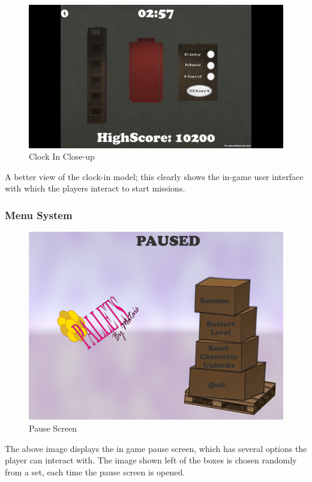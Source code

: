 \documentclass[12pt]{article}
\begin{document}
\begin{figure}[H]
	\caption{Clock In Close-up}
		\includegraphics[width=\textwidth]{images/clockInClose}
\end{figure}
A better view of the clock-in model; this clearly shows the in-game user interface with which the players interact to start missions.

\subsubsection{Menu System}
\begin{figure}[H]
	\caption{Pause Screen}
	\includegraphics[width=\textwidth]{images/pauseScreen}
\end{figure}
The above image displays the in game pause screen, which has several options the player can interact with. The image shown left of the boxes is chosen randomly from a set, each time the pause screen is opened. 
\end{document}
